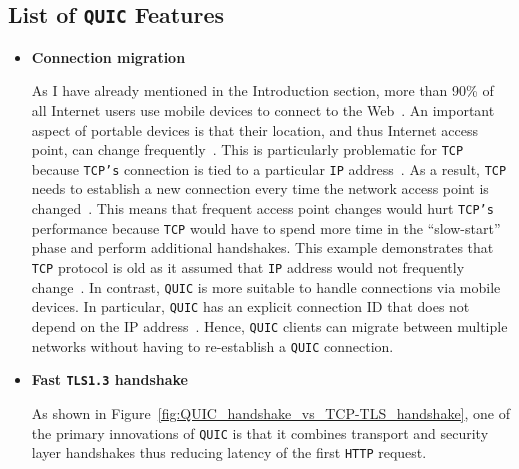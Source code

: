 \documentclass[12pt,a4paper,twoside,openright]{report}
\begin{document}
\subsection{List of \texttt{QUIC} Features}
\begin{itemize}


 \item \textbf{Connection migration} 
 
    As I have already mentioned in the Introduction section, more than 90\% of all Internet users use mobile devices to connect to the Web~\cite{bib_number_of_mobile_users}.
    An important aspect of portable devices is that their location, and thus Internet access point, can change frequently~\cite{PollardBarry2019HiAP}.
    This is particularly problematic for \texttt{TCP} because \texttt{TCP's} connection is tied to a particular \texttt{IP} address~\cite{PollardBarry2019HiAP}.
    As a result, \texttt{TCP} needs to establish a new connection every time the network access point is changed~\cite{PollardBarry2019HiAP}.
    This means that frequent access point changes would hurt \texttt{TCP's} performance because \texttt{TCP} would have to spend more time in the \enquote{slow-start} phase and perform additional handshakes.
    This example demonstrates that \texttt{TCP} protocol is old as it assumed that \texttt{IP} address would not frequently change~\cite{PollardBarry2019HiAP}.
    In contrast, \texttt{QUIC} is more suitable to handle connections via mobile devices.
    In particular, \texttt{QUIC} has an explicit connection ID that does not depend on the IP address~\cite{PollardBarry2019HiAP}.
    Hence, \texttt{QUIC} clients can migrate between multiple networks without having to re-establish a \texttt{QUIC} connection.
    
    
    





\item \textbf{Fast \texttt{TLS1.3} handshake}

As shown in Figure~\ref{fig:QUIC_handshake_vs_TCP-TLS_handshake}, one of the primary innovations of \texttt{QUIC} is that it combines transport and security layer handshakes thus reducing latency of the first \texttt{HTTP} request.



\end{itemize}
\end{document}
